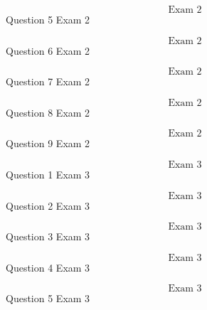 \documentclass{article}
\begin{document}

    $$\text{Exam 2}$$
    Question 5 Exam 2
    \pagebreak

    $$\text{Exam 2}$$
    Question 6 Exam 2
    \pagebreak

    $$\text{Exam 2}$$
    Question 7 Exam 2
    \pagebreak

    $$\text{Exam 2}$$
    Question 8 Exam 2
    \pagebreak

    $$\text{Exam 2}$$
    Question 9 Exam 2
    \pagebreak


    $$\text{Exam 3}$$
    Question 1 Exam 3\\
    \pagebreak

    $$\text{Exam 3}$$
    Question 2 Exam 3
    \pagebreak

    $$\text{Exam 3}$$
    Question 3 Exam 3
    \pagebreak

    $$\text{Exam 3}$$
    Question 4 Exam 3
    \pagebreak

    $$\text{Exam 3}$$
    Question 5 Exam 3
    \pagebreak
\end{document}

